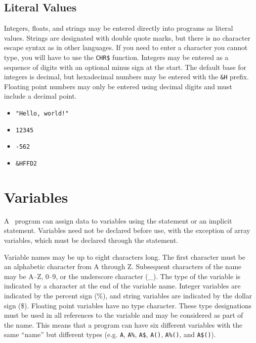 \documentclass{report}
\begin{document}
    \subsection*{Literal Values}

    Integers, floats, and strings may be entered directly into programs as literal values.
    Strings are designated with double quote marks, but there is no character escape
    syntax as in other languages. If you need to enter a character you cannot type,
    you will have to use the \verb+CHR$+ function. Integers may be entered as a sequence
    of digits with an optional minus sign at the start. The default base for integers
    is decimal, but hexadecimal numbers may be entered with the \verb+&H+ prefix.
    Floating point numbers may only be entered using decimal digits and must include a
    decimal point.

    \begin{itemize}
        \item \verb+"Hello, world!"+
        \item \verb+12345+
        \item \verb+-562+
        \item \verb+&HFFD2+
    \end{itemize}

    \section*{Variables}

    A \BASIC\ program can assign data to variables using the  statement or an implicit  statement.
    Variables need not be declared before use, with the exception of array variables, which must be declared through the
     statement.

    Variable names may be up to eight characters long. The first character must be an alphabetic character from A through Z.
    Subsequent characters of the name may be A--Z, 0--9, or the underscore character (\_). The type of the variable is indicated
    by a character at the end of the variable name. Integer variables are indicated by the percent sign (\%), and string
    variables are indicated by the dollar sign (\$).
    Floating point variables have no type character.
    These type designations must be used in all references to the variable and may
    be considered as part of the name. This means that a program can have six different variables with the same ``name'' but different
    types (e.g. \verb+A+, \verb+A%+, \verb+A$+, \verb+A()+, \verb+A%()+, and \verb+A$()+).
\end{document}
